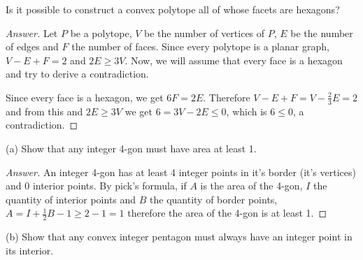 \documentclass[12pt]{article}
\begin{document}
\begin{ex}
Is it possible to construct a convex polytope all of whose facets are hexagons?
\end{ex}

\begin{proof}[Answer]
Let $P$ be a polytope, $V$ be the number of vertices of $P$, $E$ be the number of edges and $F$ the number of faces. Since every polytope is a planar graph, $V - E + F = 2$ and $2E \geq 3V$. Now, we will assume that every face is a hexagon and try to derive a contradiction.  

Since every face is a hexagon, we get $6F = 2E$. Therefore $V - E + F = V - \frac{2}{3}E = 2$ and from this and $2E \geq 3V$ we get $6 = 3V - 2E \leq 0$, which is $6 \leq 0$, a contradiction.
\end{proof}

\begin{ex}
(a) Show that any integer 4-gon must have area at least 1.
\end{ex}

\begin{proof}[Answer]
An integer 4-gon has at least 4 integer points in it's border (it's vertices) and 0 interior points. By pick's formula, if $A$ is the area of the 4-gon, $I$ the quantity of interior points and $B$ the quantity of border points, $A = I + \frac{1}{2}B - 1 \geq 2 - 1 = 1$ therefore the area of the 4-gon is at least 1.
\end{proof}

\addtocounter{exCounter}{-1}
\begin{ex}
(b) Show that any convex integer pentagon must always have an integer point in its interior.
\end{ex}
\end{document}
